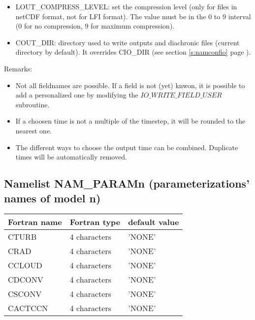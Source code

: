 \begin{itemize}
\item
{} 
LOUT\_COMPRESS\_LEVEL: set the compression level (only for files in netCDF format, not for LFI format). The value must be in the 0 to 9 interval (0 for no compression, 9 for maximum compression).

\item
{} 
COUT\_DIR: directory used to write outputs and diachronic files (current directory by default).
It overrides CIO\_DIR (see section \ref{s:namconfio} page \pageref{s:namconfio}).

\end{itemize}

Remarks:
\begin{itemize}
\item Not all fieldnames are possible. If a field is not (yet) knwon, it is possible to add a personalized one by modifying the $IO\_WRITE\_FIELD\_USER$ subroutine.
\item If a choosen time is not a multiple of the timestep, it will be rounded to the nearest one.
\item The different ways to choose the output time can be combined. Duplicate times will be automatically removed.
\end{itemize}

\subsection{Namelist NAM\_PARAMn (parameterizations' names of model n)}

\begin{center}
\begin{tabular} {|l|l|l|}
\hline
Fortran name & Fortran type & default value \\
\hline
CTURB   &  4 characters  & 'NONE'   \\
CRAD    &  4 characters  & 'NONE'   \\
CCLOUD  &  4 characters  & 'NONE'   \\
CDCONV  &  4 characters  & 'NONE'   \\
CSCONV  &  4 characters  & 'NONE'   \\
CACTCCN &  4 characters  & 'NONE'   \\
\hline
\end{tabular}
\end{center}

